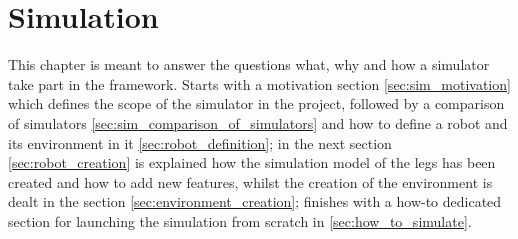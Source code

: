 
\chapter{Simulation} %
\label{cha:simulation}
This chapter is meant to answer the questions what, why and how a simulator take part in the framework.
Starts with a motivation section \ref{sec:sim_motivation} which defines the scope of the simulator
 in the project, followed by a comparison of simulators \ref{sec:sim_comparison_of_simulators} and how to define a robot and its environment in it \ref{sec:robot_definition}; in the next section \ref{sec:robot_creation} is explained how the simulation model of the legs has been created and how to add new features, whilst the creation of the environment is dealt in the section \ref{sec:environment_creation}; finishes with a how-to dedicated section for launching the simulation from scratch in \ref{sec:how_to_simulate}.







